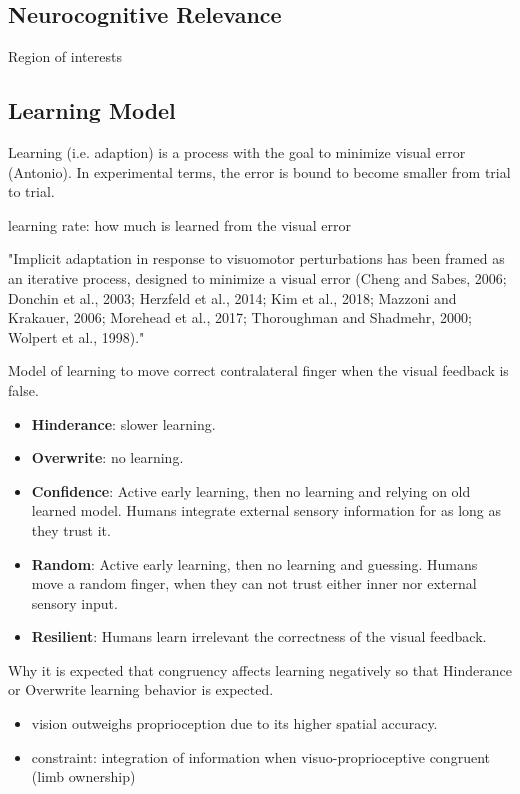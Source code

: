 \documentclass[man]{apa7}
\begin{document}
\subsection{Neurocognitive Relevance}
Region of interests
\subsection{Learning Model}

Learning (i.e. adaption) is a process with the goal to minimize visual error (Antonio). In experimental terms, the error is bound to become smaller from trial to trial.

learning rate: how much is learned from the visual error

"Implicit adaptation in response to visuomotor perturbations has been framed as an iterative process, designed to minimize a visual error (Cheng and Sabes, 2006; Donchin et al., 2003; Herzfeld et al., 2014; Kim et al., 2018; Mazzoni and Krakauer, 2006; Morehead et al., 2017; Thoroughman and Shadmehr, 2000; Wolpert et al., 1998)." \parencite{Tsay2022}

Model of learning to move correct contralateral finger when the visual feedback is false.
\begin{itemize}
    \item \textbf{Hinderance}: slower learning.
    \item \textbf{Overwrite}: no learning.
    \item \textbf{Confidence}: Active early learning, then no learning and relying on old learned model. Humans integrate external sensory information for as long as they trust it.
    \item \textbf{Random}: Active early learning, then no learning and guessing. Humans move a random finger, when they can not trust either inner nor external sensory input.
    \item \textbf{Resilient}: Humans learn irrelevant the correctness of the visual feedback.
\end{itemize}

Why it is expected that congruency affects learning negatively so that Hinderance or Overwrite learning behavior is expected.

\begin{itemize}
    \item vision outweighs proprioception due to its higher spatial accuracy.
    \item constraint: integration of information when visuo-proprioceptive congruent (limb ownership)
\end{itemize}
\end{document}
